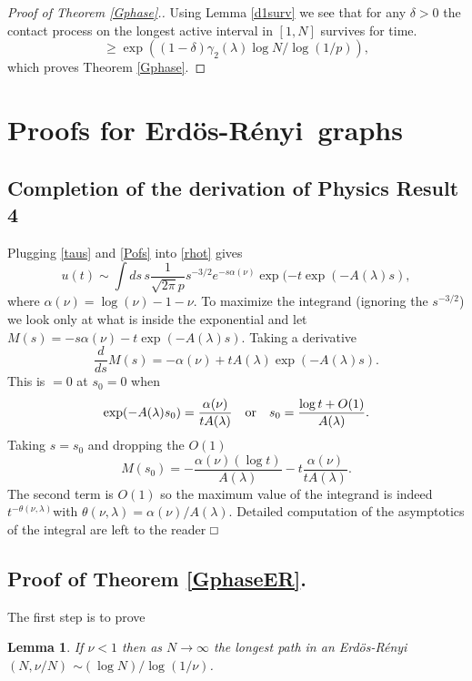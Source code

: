 \documentclass[11pt]{article}
\def\clearp{}
\newtheorem{lemma}{Lemma}[section]
\theoremstyle{definition}
\def\square{\vcenter{\vbox{\hrule height .4pt
  \hbox{\vrule width .4pt height 5pt \kern 5pt
        \vrule width .4pt} \hrule height .4pt}}}
\def\eopt{\hfill$\square$}
\def\ER{Erd\"os-R\'enyi\ }
\def\ERns{Erd\"os-R\'enyi}
\begin{document}
\begin{proof} [Proof of Theorem \ref{Gphase}.]
\noindent
Using Lemma \ref{d1surv} we see that for any $\delta>0$ the contact process on the longest active interval in $[1,N]$ survives for time.
$$
\ge \exp( (1-\delta) \gamma_2(\lambda) \log N /\log(1/p)),
$$
which proves Theorem \ref{Gphase}. \end{proof}


\clearp

\section{Proofs for \ER graphs} \label{sec:PfER}

\subsection{Completion of the derivation of Physics Result 4}


Plugging \eqref{taus} and \eqref{Pofs} into \eqref{rhot} gives
$$
u(t) \sim \int ds \, s \frac{1}{\sqrt{2\pi} p} s^{-3/2} e^{-s\alpha(\nu)} 
\exp(-t \exp(-A(\lambda) s ) ,
$$
where $\alpha(\nu) = \log(\nu) - 1- \nu$.
To maximize the integrand (ignoring the $s^{-3/2}$) we  look only at what is inside the exponential and let $M(s) =  -s\alpha(\nu) -t \exp(-A(\lambda) s )$. Taking a derivative
$$
\frac{d}{ds}M(s) 
= - \alpha(\nu) + t A(\lambda) \exp(-A(\lambda) s ).
$$
This is $=0$ at $s_0=0$ when
$$
\exp(-A(\lambda) s_0 ) =  \frac{\alpha(\nu)}{t A(\lambda)}
\quad\hbox{or}\quad s_0 = \frac{\log t + O(1)}{A(\lambda)}.
$$
Taking $s=s_0$ and dropping the $O(1)$ 
$$
M(s_0) = -\frac{\alpha(\nu)(\log t)}{A(\lambda)} -t \frac{\alpha(\nu)}{t A(\lambda)}.
$$
The second term is $O(1)$ so the maximum value of the integrand is indeed $t^{-\theta(\nu,\lambda)}$with $\theta(\nu,\lambda) = \alpha(\nu)/A(\lambda)$.
Detailed computation of the asymptotics of the integral are left to the reader \eopt


\subsection{Proof of Theorem \ref{GphaseER}.} 

The first step is to prove

\begin{lemma} \label{maxpER}
If $\nu<1$ then as $N \to\infty$ the longest path in an \ERns$(N,\nu/N)$
$\sim (\log N)/\log(1/\nu)$.
\end{lemma}
\end{document}
